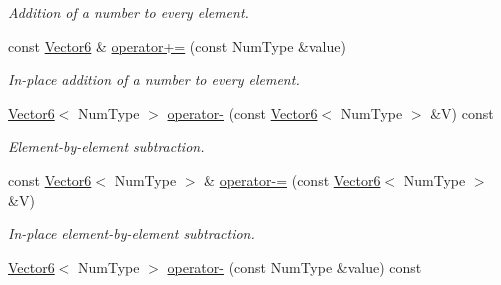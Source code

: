 \begin{DoxyCompactItemize}
\begin{DoxyCompactList}\small\item\em Addition of a number to every element. \end{DoxyCompactList}\item 
\hypertarget{singletonscrews_1_1_vector6_ae27a566503fb6055f0e56062f691b6bf}{const \hyperlink{singletonscrews_1_1_vector6}{Vector6} \& \hyperlink{singletonscrews_1_1_vector6_ae27a566503fb6055f0e56062f691b6bf}{operator+=} (const Num\+Type \&value)}\label{singletonscrews_1_1_vector6_ae27a566503fb6055f0e56062f691b6bf}

\begin{DoxyCompactList}\small\item\em In-\/place addition of a number to every element. \end{DoxyCompactList}\item 
\hypertarget{singletonscrews_1_1_vector6_a175ee0993929f1551793c48be96b2831}{\hyperlink{singletonscrews_1_1_vector6}{Vector6}$<$ Num\+Type $>$ \hyperlink{singletonscrews_1_1_vector6_a175ee0993929f1551793c48be96b2831}{operator-\/} (const \hyperlink{singletonscrews_1_1_vector6}{Vector6}$<$ Num\+Type $>$ \&V) const }\label{singletonscrews_1_1_vector6_a175ee0993929f1551793c48be96b2831}

\begin{DoxyCompactList}\small\item\em Element-\/by-\/element subtraction. \end{DoxyCompactList}\item 
\hypertarget{singletonscrews_1_1_vector6_a242ef673686ee1fc9ed6b714ecb5f473}{const \hyperlink{singletonscrews_1_1_vector6}{Vector6}$<$ Num\+Type $>$ \& \hyperlink{singletonscrews_1_1_vector6_a242ef673686ee1fc9ed6b714ecb5f473}{operator-\/=} (const \hyperlink{singletonscrews_1_1_vector6}{Vector6}$<$ Num\+Type $>$ \&V)}\label{singletonscrews_1_1_vector6_a242ef673686ee1fc9ed6b714ecb5f473}

\begin{DoxyCompactList}\small\item\em In-\/place element-\/by-\/element subtraction. \end{DoxyCompactList}\item 
\hypertarget{singletonscrews_1_1_vector6_af042f75fe2c3b55d8f5c9bfb0be11a51}{\hyperlink{singletonscrews_1_1_vector6}{Vector6}$<$ Num\+Type $>$ \hyperlink{singletonscrews_1_1_vector6_af042f75fe2c3b55d8f5c9bfb0be11a51}{operator-\/} (const Num\+Type \&value) const }\label{singletonscrews_1_1_vector6_af042f75fe2c3b55d8f5c9bfb0be11a51}


\end{DoxyCompactItemize}
